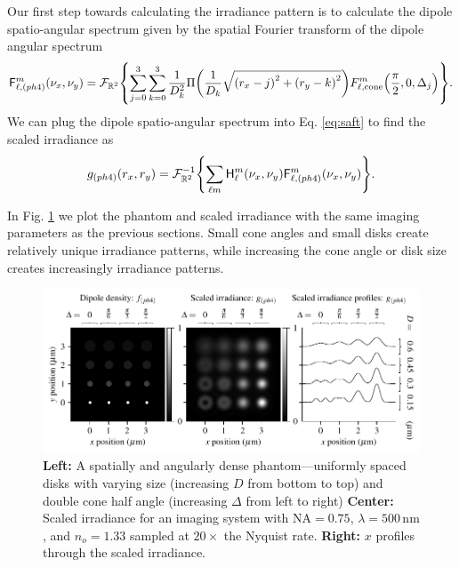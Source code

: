 \documentclass[]{osa-article}
\let\originalleft\left
\let\originalright\right
\renewcommand{\left}{\mathopen{}\mathclose\bgroup\originalleft}
\renewcommand{\right}{\aftergroup\egroup\originalright}
\providecommand{\mc}[1]{\mathcal{#1}}
\providecommand{\mbb}[1]{\mathbb{#1}}
\begin{document}
 Our first step towards calculating the irradiance pattern is to calculate the
 dipole spatio-angular spectrum given by the spatial Fourier transform of the dipole angular spectrum  
  \begin{align}
   \mathsf{F}_{\ell,(ph4)}^m(\nu_x, \nu_y) = \mc{F}_{\mbb{R}^2}\left\{\sum_{j=0}^3 \sum_{k=0}^3 \frac{1}{D_k^2}\Pi\left(\frac{1}{D_k}\sqrt{\left(r_x - j\right)^2 + \left(r_y - k\right)^2}\right)F_{\ell,\text{cone}}^m\left(\frac{\pi}{2}, 0, \Delta_j\right)\right\}.
  \end{align}
  We can plug the dipole spatio-angular spectrum into Eq. \eqref{eq:saft} to find
  the scaled irradiance as 
  \begin{align}
   g_{(ph4)}(r_x, r_y) = \mc{F}^{-1}_{\mbb{R}^2}\left\{\sum_{\ell m}\mathsf{H}_{\ell}^m(\nu_x, \nu_y)\mathsf{F}_{\ell,(ph4)}^m(\nu_x, \nu_y)\right\}.
  \end{align}

  In Fig. \ref{fig:ph4} we plot the phantom and scaled irradiance with the
  same imaging parameters as the previous sections. Small cone angles and small
  disks create relatively unique irradiance patterns, while increasing the cone
  angle or disk size creates increasingly irradiance patterns. 
  
  \begin{figure}[h]
 \centering
   \centering
   \includegraphics[scale=0.8]{../figures/paratfs/ph4.pdf}
   \caption{\textbf{Left:} A spatially and angularly dense phantom---uniformly
     spaced disks with varying size (increasing $D$ from bottom to top) and
     double cone half angle (increasing $\Delta$ from left to right)
     \textbf{Center:} Scaled irradiance for an imaging system with
     $\text{NA} = 0.75$, $\lambda = 500\,\text{nm}$, and $n_o = 1.33$ sampled at
     $20\times$ the Nyquist rate. \textbf{Right:} $x$ profiles through the
     scaled irradiance.}
   \label{fig:ph4}
 \end{figure}
 
\end{document}
